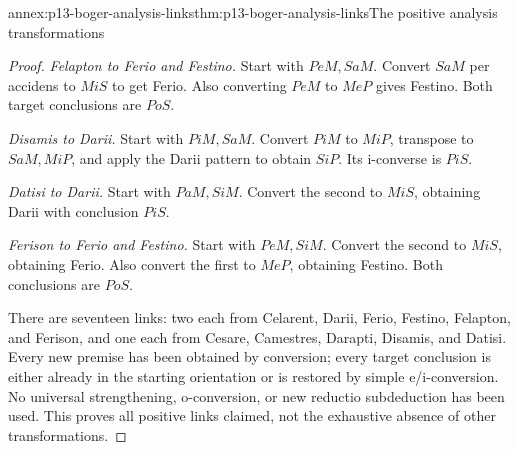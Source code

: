 \begin{annexitem}{annex:p13-boger-analysis-links}{thm:p13-boger-analysis-links}{The positive analysis transformations}
\begin{proof}
\emph{Felapton to Ferio and Festino.} Start with \(PeM,SaM\).
Convert \(SaM\) per accidens to \(MiS\) to get Ferio. Also converting
\(PeM\) to \(MeP\) gives Festino. Both target conclusions are \(PoS\).

\emph{Disamis to Darii.} Start with \(PiM,SaM\).
Convert \(PiM\) to \(MiP\), transpose to \(SaM,MiP\), and apply
the Darii pattern to obtain \(SiP\). Its i-converse is \(PiS\).

\emph{Datisi to Darii.} Start with \(PaM,SiM\).
Convert the second to \(MiS\), obtaining Darii with conclusion \(PiS\).

\emph{Ferison to Ferio and Festino.} Start with \(PeM,SiM\).
Convert the second to \(MiS\), obtaining Ferio. Also convert the first
to \(MeP\), obtaining Festino. Both conclusions are \(PoS\).

There are seventeen links: two each from Celarent, Darii, Ferio, Festino,
Felapton, and Ferison, and one each from Cesare, Camestres, Darapti,
Disamis, and Datisi. Every new premise has been obtained by conversion;
every target conclusion is either already in the starting orientation or
is restored by simple e/i-conversion. No universal strengthening, o-conversion,
or new reductio subdeduction has been used. This proves all positive links
claimed, not the exhaustive absence of other transformations.
\end{proof}
\end{annexitem}
